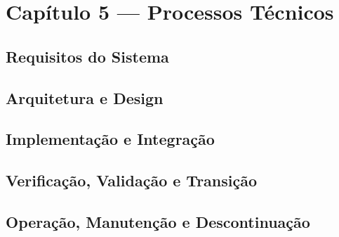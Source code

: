 \documentclass[12pt,a4paper]{article}
\begin{document}
\section{Capítulo 5 --- Processos Técnicos}
\subsection{Requisitos do Sistema}
\subsection{Arquitetura e Design}
\subsection{Implementação e Integração}
\subsection{Verificação, Validação e Transição}
\subsection{Operação, Manutenção e Descontinuação}
\end{document}

